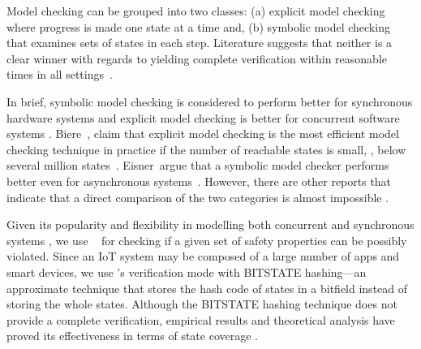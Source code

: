 {\color{black}Model checking can be grouped into two classes:
(a) explicit model checking~\cite{Clarke1982} where progress is made one state at a time and,
(b) symbolic model checking~\cite{McMillan1993} that examines sets of states in each step.
Literature suggests that neither is a clear winner 
with regards to yielding complete verification within reasonable times
in all settings~\cite{Avrunin2000:benchmarking,Eisner2002:comparing,Holzmann1999:iprotocol}.

In brief, symbolic model checking is considered to perform better for synchronous hardware systems
and explicit model checking is better for concurrent software systems
\cite{Flavio2003:symbolicmodelchecking,Choi2007:nusmvtospin,Dong1999:fighting}.
Biere~\etal, claim that explicit model checking is the most efficient model checking technique in practice
if the number of reachable states is small, \ie,
below several million states~\cite{Armin2001:verifyingsequentialbehavior}.
Eisner~\etal argue that a symbolic model checker performs better even for
asynchronous systems~\cite{Eisner2002:comparing}.
However, there are other reports that indicate that a
direct comparison of the two categories is almost impossible
\cite{Avrunin2000:benchmarking,Eisner2002:comparing,Holzmann1999:iprotocol}.}
%

{\color{black}Given its popularity and flexibility in modelling both concurrent and synchronous systems \cite{Flavio2003:symbolicmodelchecking,Choi2007:nusmvtospin,Dong1999:fighting}, we use \spin~\cite{Holzmann:spin} for checking if a given set of safety properties can be possibly violated.}
Since an IoT system may be composed of a large number of apps and smart devices,
we use \spin's verification mode with BITSTATE hashing---an approximate technique
that stores the hash code of states in a bitfield instead of storing the whole states.
Although the BITSTATE hashing technique does not provide a complete verification,
empirical results and theoretical analysis have proved its effectiveness
in terms of state coverage
\cite{Holzmann1998,Cattel94,Chaves91,Holzmann94:NewCoRe,Holzmann94:prove}.
